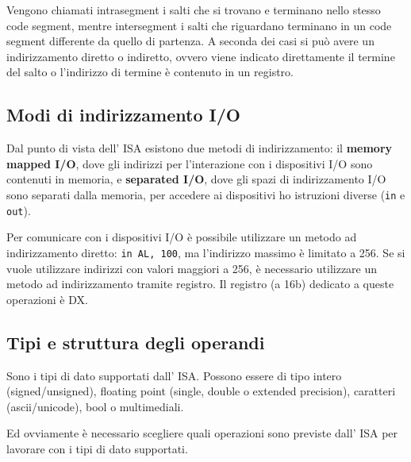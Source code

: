 \documentclass[../ace.tex]{subfiles}
\begin{document}
Vengono chiamati intrasegment i salti che si trovano e terminano nello stesso code segment, mentre intersegment
i salti che riguardano terminano in un code segment differente da quello di partenza.
A seconda dei casi si può avere un indirizzamento diretto o indiretto, ovvero viene indicato
direttamente il termine del salto o l'indirizzo di termine è contenuto in un registro.

\subsection{Modi di indirizzamento I/O}
Dal punto di vista dell' ISA esistono due metodi di indirizzamento: il \textbf{memory mapped I/O},
dove gli indirizzi per l'interazione con i dispositivi I/O sono contenuti in memoria,
e \textbf{separated I/O}, dove gli spazi di indirizzamento I/O sono separati dalla memoria,
per accedere ai dispositivi ho istruzioni diverse (\lstinline{in} e \lstinline{out}).

Per comunicare con i dispositivi I/O è possibile utilizzare un metodo ad indirizzamento
diretto: \lstinline{in AL, 100}, ma l'indirizzo massimo è limitato a 256.
Se si vuole utilizzare indirizzi con valori maggiori a 256, è necessario utilizzare un metodo
ad indirizzamento tramite registro. Il registro (a 16b) dedicato a queste operazioni è DX.

\subsection{Tipi e struttura degli operandi}
Sono i tipi di dato supportati dall' ISA. Possono essere di tipo intero (signed/unsigned), floating point
(single, double o extended precision), caratteri (ascii/unicode), bool o multimediali.

Ed ovviamente è necessario scegliere quali operazioni sono previste dall' ISA per lavorare con
i tipi di dato supportati.
\end{document}
